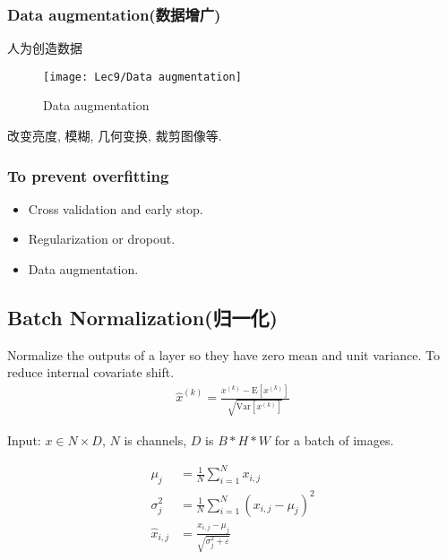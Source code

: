 \subsubsection{Data augmentation(数据增广)}
人为创造数据

\begin{figure}[H]
    \centering
    \texttt{[image: Lec9/Data augmentation]}
    \caption{Data augmentation}
\end{figure}

改变亮度, 模糊, 几何变换, 裁剪图像等. 

\subsubsection{To prevent overfitting}
\begin{itemize}
    \item Cross validation and early stop.
    \item Regularization or dropout.
    \item Data augmentation. 
\end{itemize}

\subsection{Batch Normalization(归一化)}
Normalize the outputs of a layer so they have zero mean and unit variance. To reduce internal covariate shift.
\begin{align*}
    \hat{x}^{(k)}=\frac{x^{(k)}-\mathrm{E}\left[x^{(k)}\right]}{\sqrt{\mathrm{Var}\left[x^{(k)}\right]}}
\end{align*}

Input: $x \in N \times D$, $N$ is channels, $D$ is $B*H*W$ for a batch of images.

\begin{multicols}{2}
    \begin{align*}
        \mu_j&=\frac{1}{N}\sum_{i=1}^N x_{i,j}\\
        \sigma_j^2&=\frac{1}{N}\sum_{i=1}^{N}(x_{i,j}-\mu_j)^2\\
        \hat{x}_{i,j}&=\frac{x_{i,j}-\mu_j}{\sqrt{\sigma_j^2+\varepsilon }}
    \end{align*}
    \columnbreak
    \begin{figure}[H]
        \centering
    \end{figure}
\end{multicols}

